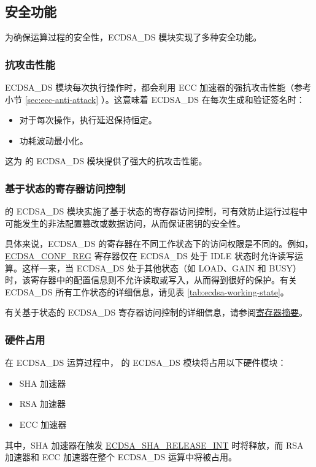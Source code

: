 \documentclass[main\_\_CN.tex]{subfiles}
\begin{document}

\subsection{安全功能}
\label{sec:ecdsa-security_features}
为确保运算过程的安全性，ECDSA\_DS 模块实现了多种安全功能。

\subsubsection{抗攻击性能}\label{sec:ecdsa-anti-attack}

\chipseries{} ECDSA\_DS 模块每次执行操作时，都会利用 ECC 加速器的强抗攻击性能（参考小节 \ref{sec:ecc-anti-attack} \textit{}）。这意味着 ECDSA\_DS 在每次生成和验证签名时：

\begin{itemize}
    \item 对于每次操作，执行延迟保持恒定。
    \item 功耗波动最小化。
\end{itemize}

这为 \chipseries{} 的 ECDSA\_DS 模块提供了强大的抗攻击性能。

\subsubsection{基于状态的寄存器访问控制}

\chipseries{} 的 ECDSA\_DS 模块实施了基于状态的寄存器访问控制，可有效防止运行过程中可能发生的非法配置篡改或数据访问，从而保证密钥的安全性。

具体来说，ECDSA\_DS 的寄存器在不同工作状态下的访问权限是不同的。例如，\hyperref[regdesc:ECDSACONFREG]{ECDSA\_CONF\_REG} 寄存器仅在 ECDSA\_DS 处于 IDLE 状态时允许读写运算。这样一来，当 ECDSA\_DS 处于其他状态（如 LOAD、GAIN 和 BUSY）时，该寄存器中的配置信息则不允许读取或写入，从而得到很好的保护。有关 ECDSA\_DS 所有工作状态的详细信息，请见表 \ref{tab:ecdsa-working-state}。

有关基于状态的 ECDSA\_DS 寄存器访问控制的详细信息，请参阅\hyperref[sec:ecdsa-reg-summ]{寄存器摘要}。

\subsubsection{硬件占用}

在 ECDSA\_DS 运算过程中，\chipname{} 的 ECDSA\_DS 模块将占用以下硬件模块：
\begin{itemize}
    \item SHA 加速器
    \item RSA 加速器
    \item ECC 加速器
\end{itemize}
其中，SHA 加速器在触发 \hyperref[int:ECDSASHARELEASEINT]{ECDSA\_SHA\_RELEASE\_INT} 时将释放，而 RSA 加速器和 ECC 加速器在整个 ECDSA\_DS 运算中将被占用。
\end{document}
